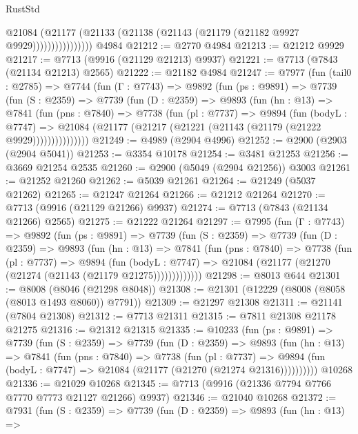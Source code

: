 \begin{lexlean}{RustStd}
\begin{coremodule}
                      @21084
                        (@21177 (@21133 (@21138 (@21143 (@21179 (@21182 @9927 @9929))))))))))))))))
    @4984
@21212 := @2770 @4984
@21213 := @21212 @9929
@21217 := @7713 (@9916 (@21129 @21213) @9937)
@21221 := @7713 (@7843 (@21134 @21213) @2565)
@21222 := @21182 @4984
@21247 := @7977
    (fun (tail0 : @2785) =>
    @7744
      (fun (Γ : @7743) =>
      @9892
        (fun (ps : @9891) =>
        @7739
          (fun (S : @2359) =>
          @7739
            (fun (D : @2359) =>
            @9893
              (fun (hn : @13) =>
              @7841
                (fun (pns : @7840) =>
                @7738
                  (fun (pl : @7737) =>
                  @9894
                    (fun (bodyL : @7747) =>
                    @21084 (@21177 (@21217 (@21221 (@21143 (@21179 (@21222 @9929)))))))))))))))
@21249 := @4989 (@2904 @4996)
@21252 := @2900 (@2903 (@2904 @5041))
@21253 := @3354 @10178
@21254 := @3481 @21253
@21256 := @3669 @21254 @2535
@21260 := @2900 (@5049 (@2904 @21256)) @3003
@21261 := @21252 @21260
@21262 := @5039 @21261
@21264 := @21249 (@5037 @21262)
@21265 := @21247 @21264
@21266 := @21212 @21264
@21270 := @7713 (@9916 (@21129 @21266) @9937)
@21274 := @7713 (@7843 (@21134 @21266) @2565)
@21275 := @21222 @21264
@21297 := @7995
    (fun (Γ : @7743) =>
    @9892
      (fun (ps : @9891) =>
      @7739
        (fun (S : @2359) =>
        @7739
          (fun (D : @2359) =>
          @9893
            (fun (hn : @13) =>
            @7841
              (fun (pns : @7840) =>
              @7738
                (fun (pl : @7737) =>
                @9894
                  (fun (bodyL : @7747) =>
                  @21084 (@21177 (@21270 (@21274 (@21143 (@21179 @21275)))))))))))))
@21298 := @8013 @644
@21301 := @8008 (@8046 (@21298 @8048))
@21308 := @21301 (@12229 (@8008 (@8058 (@8013 @1493 @8060)) @7791))
@21309 := @21297 @21308
@21311 := @21141 (@7804 @21308)
@21312 := @7713 @21311
@21315 := @7811 @21308 @21178 @21275
@21316 := @21312 @21315
@21335 := @10233
    (fun (ps : @9891) =>
    @7739
      (fun (S : @2359) =>
      @7739
        (fun (D : @2359) =>
        @9893
          (fun (hn : @13) =>
          @7841
            (fun (pns : @7840) =>
            @7738
              (fun (pl : @7737) =>
              @9894 (fun (bodyL : @7747) => @21084 (@21177 (@21270 (@21274 @21316))))))))))
    @10268
@21336 := @21029 @10268
@21345 := @7713 (@9916 (@21336 @7794 @7766 @7770 @7773 @21127 @21266) @9937)
@21346 := @21040 @10268
@21372 := @7931
    (fun (S : @2359) =>
    @7739
      (fun (D : @2359) =>
      @9893
        (fun (hn : @13) =>

\end{coremodule}
\end{lexlean}
